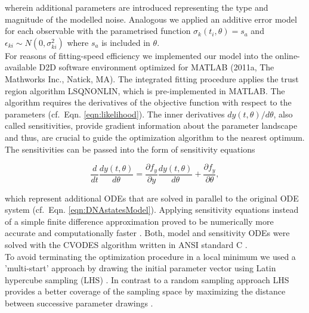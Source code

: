 wherein additional parameters are introduced representing the type and magnitude of the modelled noise. Analogous we applied an additive error model for each observable with the parametrised function $\sigma_{k}(t_i,\theta) = s_a$ and $\epsilon_{ki} \sim N(0,\sigma_{ki}^2)$ where $s_a$ is included in $\theta$.\\ 
For reasons of fitting-speed efficiency we implemented our model into the online-available D2D software environment \cite{Raue2013} optimized for MATLAB (2011a, The Mathworks Inc., Natick, MA). The integrated fitting procedure applies the trust region algorithm LSQNONLIN, which is pre-implemented in MATLAB. The algorithm requires the derivatives of the objective function with respect to the parameters (cf.\ Eqn. \ref{eqn:likelihood}). The inner derivatives $dy(t,\theta)/d\theta$, also called sensitivities, provide gradient information about the parameter landscape and thus, are crucial to guide the optimization algorithm to the nearest optimum. The sensitivities can be passed into the form of sensitivity equations 

\begin{equation}
	\frac{d}{dt}\frac{dy(t,\theta)}{d\theta} = \frac{\partial f_y}{\partial y}\frac{dy(t,\theta)}{d\theta}+\frac{\partial f_y}{\partial \theta},
\end{equation}  

which represent additional ODEs that are solved in parallel to the original ODE system (cf.\ Eqn. \ref{eqn:DNAstatesModel})\cite{Leis1988}. Applying sensitivity equations instead of a simple finite difference approximation proved to be numerically more accurate and computationally faster \cite{Raue2013}. Both, model and sensitivity ODEs were solved with the CVODES algorithm written in ANSI standard C \cite{Hindmarsh2005}. \\
To avoid terminating the optimization procedure in a local minimum we used a 'multi-start' approach by drawing the initial parameter vector using Latin hypercube sampling (LHS) \cite{Owen2014}. In contrast to a random sampling approach LHS provides a better coverage of the sampling space by maximizing the distance between successive parameter drawings \cite{Raue2013}.    

